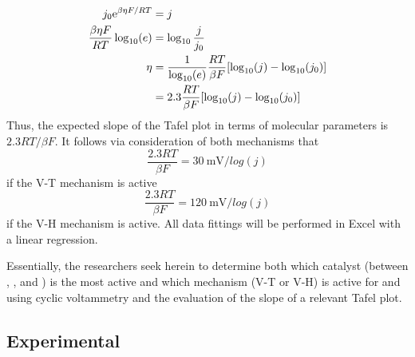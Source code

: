 \documentclass[../labs.tex]{subfiles}
\begin{document}
\begin{align}
    \begin{split}
        j_0\e[\beta\eta F/RT] &= j\\
        \frac{\beta\eta F}{RT}\log_{10}(e) &= \log_{10}\frac{j}{j_0}\\
        \eta &= \frac{1}{\log_{10}(e)}\frac{RT}{\beta F}[\log_{10}(j)-\log_{10}(j_0)]\\
        &= 2.3\frac{RT}{\beta F}[\log_{10}(j)-\log_{10}(j_0)]
    \end{split}
\end{align}
Thus, the expected slope of the Tafel plot in terms of molecular parameters is $2.3RT/\beta F$. It follows via consideration of both mechanisms that
\begin{equation}
    \frac{2.3RT}{\beta F} = \SI{30}{\milli\volt/log(j)}
\end{equation}
if the V-T mechanism is active
\begin{equation}
    \frac{2.3RT}{\beta F} = \SI{120}{\milli\volt/log(j)}
\end{equation}
if the V-H mechanism is active. All data fittings will be performed in Excel with a linear regression.\par
Essentially, the researchers seek herein to determine both which catalyst (between , , and ) is the most active and which mechanism (V-T or V-H) is active for  and  using cyclic voltammetry and the evaluation of the slope of a relevant Tafel plot.


\subsection*{Experimental}
\end{document}
